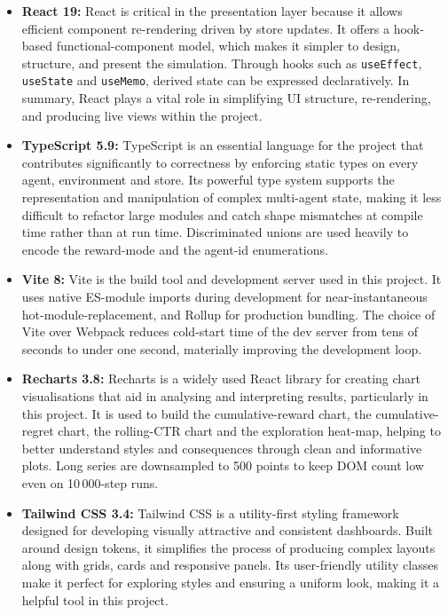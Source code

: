 \begin{itemize}
\item \textbf{React 19:} React is critical in the presentation layer because it allows efficient component re-rendering driven by store updates. It offers a hook-based functional-component model, which makes it simpler to design, structure, and present the simulation. Through hooks such as \texttt{useEffect}, \texttt{useState} and \texttt{useMemo}, derived state can be expressed declaratively. In summary, React plays a vital role in simplifying UI structure, re-rendering, and producing live views within the project.

\item \textbf{TypeScript 5.9:} TypeScript is an essential language for the project that contributes significantly to correctness by enforcing static types on every agent, environment and store. Its powerful type system supports the representation and manipulation of complex multi-agent state, making it less difficult to refactor large modules and catch shape mismatches at compile time rather than at run time. Discriminated unions are used heavily to encode the reward-mode and the agent-id enumerations.

\item \textbf{Vite 8:} Vite is the build tool and development server used in this project. It uses native ES-module imports during development for near-instantaneous hot-module-replacement, and Rollup for production bundling. The choice of Vite over Webpack reduces cold-start time of the dev server from tens of seconds to under one second, materially improving the development loop.

\item \textbf{Recharts 3.8:} Recharts is a widely used React library for creating chart visualisations that aid in analysing and interpreting results, particularly in this project. It is used to build the cumulative-reward chart, the cumulative-regret chart, the rolling-CTR chart and the exploration heat-map, helping to better understand styles and consequences through clean and informative plots. Long series are downsampled to 500 points to keep DOM count low even on 10\,000-step runs.

\item \textbf{Tailwind CSS 3.4:} Tailwind CSS is a utility-first styling framework designed for developing visually attractive and consistent dashboards. Built around design tokens, it simplifies the process of producing complex layouts along with grids, cards and responsive panels. Its user-friendly utility classes make it perfect for exploring styles and ensuring a uniform look, making it a helpful tool in this project.


\end{itemize}
